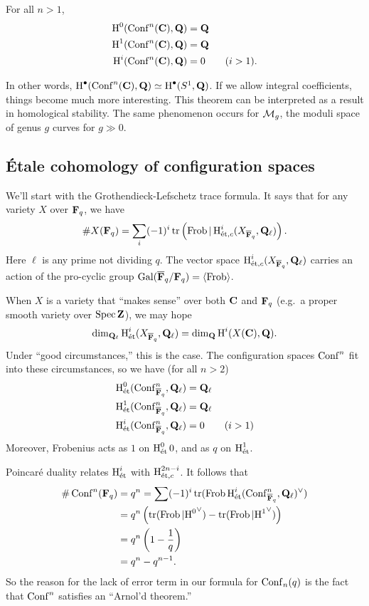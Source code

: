 \begin{theorem}[Arnol'd]
For all $n>1$, 
\begin{align*}
  \h^0(\conf^n(\dC),\dQ) &=\dQ \\
  \h^1(\conf^n(\dC),\dQ) &= \dQ \\
  \h^i(\conf^n(\dC),\dQ) &= 0 \qquad (i>1) .
\end{align*}
\end{theorem}
In other words, $\h^\bullet(\conf^n(\dC),\dQ) \simeq \h^\bullet(S^1,\dQ)$. If 
we allow integral coefficients, things become much more interesting. This 
theorem can be interpreted as a result in homological stability. The same 
phenomenon occurs for $\cM_g$, the moduli space of genus $g$ curves for 
$g\gg 0$. 





\subsection{\'Etale cohomology of configuration spaces}

We'll start with the Grothendieck-Lefschetz trace formula. It says that for any 
variety $X$ over $\dF_q$, we have 
\[
  \# X(\dF_q) = \sum_i (-1)^i \trace\left(\frob|\h_{\et,c}^i(X_{\bar\dF_q},\dQ_\ell)\right) .
\]
Here $\ell$ is any prime not dividing $q$. The vector space 
$\h_{\et,c}^i(X_{\bar\dF_q},\dQ_\ell)$ carries an action of the pro-cyclic 
group $\gal(\bar\dF_q/\dF_q) = \langle \frob\rangle$. 

When $X$ is a variety that ``makes sense'' over both $\dC$ and $\dF_q$ (e.g.\ 
a proper smooth variety over $\spec\dZ$), we may hope 
\[
  \dim_{\dQ_\ell} \h^i_\et(X_{\bar\dF_q},\dQ_\ell) = \dim_\dQ \h^i(X(\dC),\dQ) .
\]
Under ``good circumstances,'' this is the case. The configuration spaces 
$\conf^n$ fit into these circumstances, so we have (for all $n>2$) 
\begin{align*}
  \h_\et^0(\conf^n_{\bar\dF_q},\dQ_\ell) &= \dQ_\ell \\
  \h_\et^1(\conf^n_{\bar\dF_q},\dQ_\ell) &= \dQ_\ell \\
  \h_\et^i(\conf^n_{\bar\dF_q},\dQ_\ell) &= 0 \qquad (i>1)
\end{align*}
Moreover, Frobenius acts as $1$ on $\h_\et^00$, and as $q$ on $\h_\et^1$. 

Poincar\'e duality relates $\h_\et^i$ with $\h^{2n-i}_{\et,c}$. It follows 
that 
\begin{align*}
  \# \conf^n(\dF_q) &= q^n = \sum (-1)^i \trace(\frob\h^i_\et(\conf^n_{\bar\dF_q},\dQ_\ell)^\vee) \\
    &= q^n\left(\trace(\frob|{\h^0}^\vee) - \trace(\frob|{\h^1}^\vee)\right) \\
    &= q^n\left(1-\frac 1 q\right) \\
    &= q^n-q^{n-1} .
\end{align*}
So the reason for the lack of error term in our formula for $\conf_n(q)$ is the 
fact that $\conf^n$ satisfies an ``Arnol'd theorem.'' 

